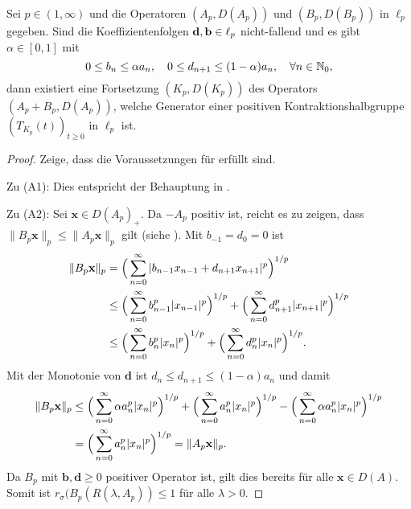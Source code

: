 \begin{fsatz}\cite{banasiak_lachowicz_2007}\label{Fortsetzung von K_p}
Sei $p\in(1,\infty)$ und die  Operatoren $(A_p, D(A_p))$ und  $(B_p, D(B_p))$ in $\ell_p$ gegeben. Sind die Koeffizientenfolgen $\textnormal{\textbf{d}}, \textnormal{\textbf{b}}\in \ell_p$ nicht-fallend und es gibt $\alpha\in[0,1]$ mit 
\begin{equation*}\label{Annahme für Abschätzung}
0\leq b_n\leq \alpha a_n,\quad 0\leq d_{n+1}\leq (1-\alpha)a_n, \quad \forall n\in \mathbb{N}_0,
\end{equation*}
dann existiert eine Fortsetzung $(K_p, D(K_p))$ des Operators $(A_p + B_p, D(A_p))$, welche Generator einer positiven Kontraktionshalbgruppe $(T_{K_p}(t))_{t\geq0}$ in $\ell_p$ ist.
\end{fsatz}

\begin{proof}
\par
Zeige, dass die Voraussetzungen für  erfüllt sind.

\par
Zu (A1): Dies entspricht der Behauptung in .

\par
Zu (A2): Sei $\textbf{x}\in D(A_p)_+$. Da $-A_p$ positiv ist, reicht es zu zeigen, dass  $\|B_p\textbf{x}\|_p\leq\|A_p\textbf{x}\|_p$ gilt (siehe  ). Mit $b_{-1}=d_0=0$ ist
\begin{align*}
\|B_p\textnormal{\textbf{x}}\|_p
&= \Big(\sum_{n=0}^\infty |b_{n-1}x_{n-1} + d_{n+1}x_{n+1}|^p\Big)^{1/p}\\
&\leq \Big(\sum_{n=0}^\infty b_{n-1}^p |x_{n-1}|^p\Big)^{1/p} + \Big(\sum_{n=0}^\infty d_{n+1}^p |x_{n+1}|^p\Big)^{1/p}\\
&\leq \Big(\sum_{n=0}^\infty b_n^p|x_n|^p\Big)^{1/p} + \Big(\sum_{n=0}^\infty d_n^p |x_n|^p\Big)^{1/p}.
\end{align*}
Mit der Monotonie von $\textbf{d}$ ist $d_{n}\leq d_{n+1}\leq (1-\alpha)a_n$ und damit
\begin{align*}
\|B_p\textnormal{\textbf{x}}\|_p
&\leq \Big(\sum_{n=0}^\infty \alpha a_n^p|x_n|^p\Big)^{1/p} + \Big(\sum_{n=0}^\infty a_n^p |x_n|^p\Big)^{1/p} - \Big(\sum_{n=0}^\infty \alpha a_n^p |x_n|^p\Big)^{1/p}\\
&= \Big(\sum_{n=0}^\infty a_n^p |x_n|^p\Big)^{1/p}= \|A_p \textnormal{\textbf{x}}\|_p.
\end{align*}
Da $B_p$ mit $\textbf{b},\textbf{d}\geq0$ positiver Operator ist, gilt dies bereits für alle $\textbf{x}\in D(A)$. Somit ist $r_\sigma(B_p(R(\lambda, A_p))\leq 1$ für alle $\lambda>0$.


\end{proof}
